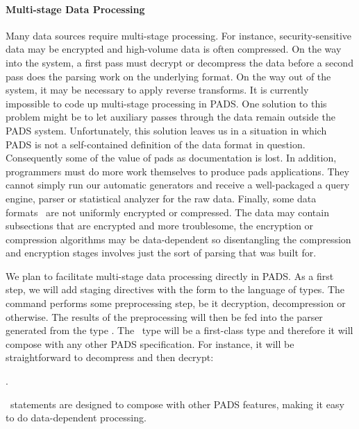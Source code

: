 \documentclass[11pt]{article}
\begin{document}
\paragraph*{Multi-stage Data Processing}
Many data sources require multi-stage processing.  For instance,
security-sensitive data may be encrypted and high-volume data
is often compressed.  On the way into the system, a first 
pass must decrypt or decompress the data before a second pass
does the parsing work on the underlying format.  On the way out of the system, 
it may be necessary to apply reverse transforms.  
It is currently impossible to code up multi-stage processing in PADS.
One solution
to this problem might be to let auxiliary passes through the data
remain outside the PADS system.  Unfortunately, this solution
leaves us in a situation in which PADS is not a self-contained
definition of the data format in question.  Consequently some of the value
of pads as documentation is lost.  In addition, programmers must do
more work themselves to produce pads applications.  They cannot
simply run our automatic generators and receive a well-packaged 
a query engine, parser or statistical analyzer for the raw data.
Finally, some data formats~\cite{korn+:delta,korn+:data-format} are not 
uniformly encrypted or compressed.
The data may contain subsections that are encrypted and more troublesome,
the encryption or compression algorithms may be data-dependent so
disentangling the compression and encryption stages 
involves just the sort of parsing that \pads{} was built for.

We plan to facilitate multi-stage data processing directly in PADS.  As a
first step, we will add staging directives with the form 
 to the language of types.
The command  performs some preprocessing step, be it
decryption, decompression or otherwise.  The results of the preprocessing
will then be fed into the parser generated from the type .
The \Pthen\ type will be a first-class type and therefore it will compose
with any other PADS specification.  For instance, it will be straightforward to
decompress and then decrypt:  

.  

\Pthen\ statements are designed to compose with other PADS features, making
it easy to do data-dependent processing.
\end{document}
